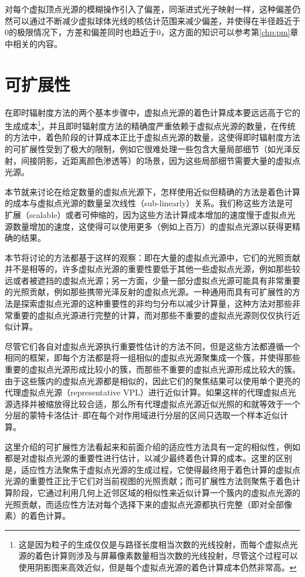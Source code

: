 对每个虚拟顶点光源的模糊操作引入了偏差，同渐进式光子映射一样，这种偏差仍然可以通过不断减少虚拟球体光线的核估计范围来减少偏差，并使得在半径趋近于0的极限情况下，方差和偏差同时也趋近于0，这方面的知识可以参考第\ref{chp:pm}章中相关的内容。




\section{可扩展性}
在即时辐射度方法的两个基本步骤中，虚拟点光源的着色计算成本要远远高于它的生成成本\footnote{这是因为粒子的生成仅仅是与路径长度相当次数的光线投射，而每个虚拟点光源的着色计算则涉及与屏幕像素数量相当次数的光线投射，尽管这个过程可以使用阴影图来高效近似，但是每个虚拟点光源的着色计算成本仍然非常高。}，并且即时辐射度方法的精确度严重依赖于虚拟点光源的数量，在传统的方法中，着色阶段的计算成本正比于虚拟点光源的数量，这使得即时辐射度方法的可扩展性受到了极大的限制，例如它很难处理一些包含大量局部细节（如光泽反射，间接阴影，近距离颜色渗透等）的场景，因为这些局部细节需要大量的虚拟点光源。

本节就来讨论在给定数量的虚拟点光源下，怎样使用近似但精确的方法是着色计算的成本与虚拟点光源的数量呈次线性（sub-linearly）关系。我们称这些方法是可扩展（scalable）或者可伸缩的，因为这些方法计算成本增加的速度慢于虚拟点光源数量增加的速度，这使得可以使用更多（例如上百万）的虚拟点光源以获得更精确的结果。

本节将讨论的方法都基于这样的观察：即在大量的虚拟点光源中，它们的光照贡献并不是相等的，许多虚拟点光源的重要性要低于其他一些虚拟点光源，例如那些较远或者被遮挡的虚拟点光源；另一方面，少量一部分虚拟点光源可能具有非常重要的光照贡献，例如那些携带光泽反射的虚拟点光源。一种通用而具有可扩展性的方法是探索虚拟点光源的这种重要性的非均匀分布以减少计算量，这种方法对那些非常重要的虚拟点光源进行完整的计算，而对那些不重要的虚拟点光源则仅仅执行近似计算。

尽管它们各自对虚拟点光源执行重要性估计的方法不同，但是这些方法都遵循一个相同的框架，即每个方法都是将一组相似的虚拟点光源聚集成一个簇，并使得那些重要的虚拟点光源形成比较小的簇，而那些不重要的虚拟点光源形成比较大的簇。由于这些簇内的虚拟点光源都是相似的，因此它们的聚焦结果可以使用单个更亮的代理虚拟点光源（representative VPL）进行近似计算。如果这样的代理虚拟点光源选择并被缩放得比较合适，那么所有代理虚拟点光源近似光照的和就等效于一个分层的蒙特卡洛估计--即在每个对作用域进行分层的区间只选取一个样本近似计算。

\begin{myshaded}
	这里介绍的可扩展性方法看起来和前面介绍的适应性方法具有一定的相似性，例如都是对虚拟点光源的重要性进行估计，以减少最终着色计算的成本。这里的区别是，适应性方法聚焦于虚拟点光源的生成过程，它使得最终用于着色计算的虚拟点光源的重要性正比于它们对当前视图的光照贡献；而可扩展性方法则聚焦于着色计算阶段，它通过利用几何上近邻区域的相似性来近似计算一个簇内的虚拟点光源的光照贡献，而适应性方法对每个选择下来的虚拟点光源都执行完整（即对全部像素）的着色计算。
\end{myshaded}


